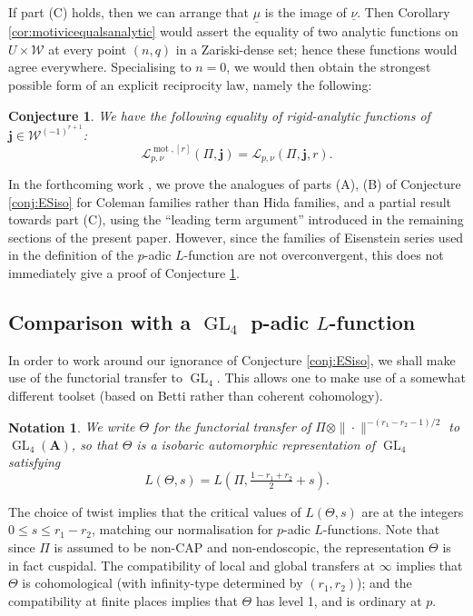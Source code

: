 \documentclass[cjm]{ipart}
\theoremstyle{plain}
\newtheorem{notation}[theorem]{Notation}
\newtheorem{conjecture}[theorem]{Conjecture}
\theoremstyle{remark}
\DeclareMathOperator{\GL}{GL}
\DeclareMathOperator{\mot}{mot}
\newcommand{\bfj}{\mathbf{j}}
\newcommand{\cL}{\mathcal{L}}
\newcommand{\cW}{\mathcal{W}}
\newcommand{\unu}{\underline{\nu}}
\renewcommand{\AA}{\mathbf{A}}
\numberwithin{equation}{subsection}
\renewcommand{\le}{\leqslant}
\begin{document}
  If part (C) holds, then we can arrange that $\underline{\mu}$ is the image of $\unu$. Then Corollary \ref{cor:motivicequalsanalytic} would assert the equality of two analytic functions on $U \times \cW$ at every point $(n, q)$ in a Zariski-dense set; hence these functions would agree everywhere. Specialising to $n = 0$, we would then obtain the strongest possible form of an explicit reciprocity law, namely the following:

  \begin{conjecture}
   \label{conj:ERLstrong}
   We have the following equality of rigid-analytic functions of $\bfj \in \cW^{(-1)^{r+1}}$:
   \[ \cL^{\mot, [r]}_{p, \nu}(\Pi, \bfj) = \cL_{p, \nu}(\Pi, \bfj, r).\]
  \end{conjecture}

  \begin{remark}
   In the forthcoming work \cite{LZ21-erl}, we prove the analogues of parts (A), (B) of Conjecture \ref{conj:ESiso} for Coleman families rather than Hida families, and a partial result towards part (C), using the ``leading term argument'' introduced in the remaining sections of the present paper. However, since the families of Eisenstein series used in the definition of the $p$-adic $L$-function are not overconvergent, this does not immediately give a proof of Conjecture \ref{conj:ERLstrong}.
  \end{remark}

 \subsection{Comparison with a $\GL_4$ p-adic $L$-function}

  In order to work around our ignorance of Conjecture \ref{conj:ESiso}, we shall make use of the functorial transfer to $\GL_4$. This allows one to make use of a somewhat different toolset (based on Betti rather than coherent cohomology).

  \begin{notation}
   We write $\Theta$ for the functorial transfer of $\Pi \otimes \|\cdot\|^{-(r_1 - r_2 - 1)/2}$ to $\GL_4(\AA)$, so that $\Theta$ is a isobaric automorphic representation of $\GL_4$ satisfying
   \[ L(\Theta, s) = L(\Pi, \tfrac{1-r_1 + r_2}{2} + s).\]
  \end{notation}

  The choice of twist implies that the critical values of $L(\Theta, s)$ are at the integers $0 \le s \le r_1 - r_2$, matching our normalisation for $p$-adic $L$-functions. Note that since $\Pi$ is assumed to be non-CAP and non-endoscopic, the representation $\Theta$ is in fact cuspidal. The compatibility of local and global transfers at $\infty$ implies that $\Theta$ is cohomological (with infinity-type determined by $(r_1, r_2)$); and the compatibility at finite places implies that $\Theta$ has level 1, and is ordinary at $p$.
\end{document}

